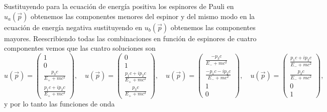 \documentclass[11pt,letterpaper]{article}     %
\begin{document}
Sustituyendo para la ecuación de energía positiva los espinores de Pauli en $u_a(\vec{p})$ obtenemos las componentes menores del espinor y del mismo modo en la ecuación de energía negativa sustituyendo en $u_b(\vec{p})$ obtenemos las componentes mayores. Reescribiendo todas las combinaciones en función de espinores de cuatro componentes vemos que las cuatro soluciones son
\begin{equation} \label{eq:56}
u(\vec{p})=\begin{pmatrix}
1 \\ 0 \\ \frac{p_3 c}{E_+ + mc^2} \\ \frac{p_1 c + ip_2 c}{E_+ + mc^2}
\end{pmatrix}, \quad
u(\vec{p})=\begin{pmatrix}
0 \\ 1  \\ \frac{p_1 c + ip_2 c}{E_+ + mc^2}\\ \frac{p_3 c}{E_+ + mc^2}
\end{pmatrix}, \quad
u(\vec{p})=\begin{pmatrix}
\frac{-p_3 c}{E_- +mc^2} \\ \frac{-p_1 c - ip_2 c}{E_- + mc^2}  \\ 1\\ 0
\end{pmatrix}, \quad
u(\vec{p})=\begin{pmatrix}
\frac{p_1 c + ip_2 c}{E_- + mc^2}\\ \frac{p_3 c}{E_- + mc^2} \\ 0 \\ 1  
\end{pmatrix},
\end{equation}
y por lo tanto las funciones de onda
\end{document}
